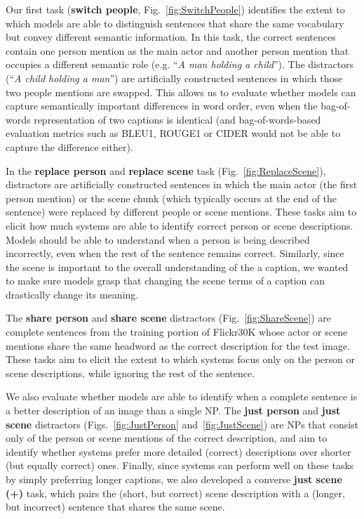 \documentclass[11pt]{article}
\begin{document}
Our first task (\textbf{switch people}, Fig.~\ref{fig:SwitchPeople}) identifies the extent to which models are able to distinguish sentences that share the same vocabulary but convey different semantic information. In this task,  the correct sentences contain one person mention as the main actor and another person mention that occupies a different semantic role (e.g. ``\textit{A man holding a child}''). The distractors (``\textit{A child holding a man}'') are artificially constructed sentences in which those two people mentions are swapped. This allows us to evaluate whether models can capture semantically important differences in word order, even when the bag-of-words representation of two captions is identical (and bag-of-words-based evaluation metrics such as BLEU1, ROUGE1 or CIDER would not be able to capture the difference
 either). 

In the \textbf{replace person} and \textbf{replace scene} task (Fig.~\ref{fig:ReplaceScene}), distractors are artificially constructed sentences in which the main actor (the first person mention) or the scene chunk (which typically occurs at the end of the sentence) were replaced by different people or scene mentions. These tasks aim to elicit how much systems are able to identify correct person or scene descriptions.  Models should be able to understand when a person is being described incorrectly, even when the rest of the sentence remains correct.  Similarly, since the scene is important to the overall understanding of the a caption, we wanted to make sure models grasp that changing the scene terms of a caption can drastically change its meaning. 

The \textbf{share person} and \textbf{share scene} distractors (Fig.~\ref{fig:ShareScene}) are complete sentences  from the training portion of  Flickr30K whose actor or scene mentions share the same headword as the correct description for the test image. These tasks aim to elicit the extent to which systems focus only on the person or scene descriptions, while ignoring the rest of the sentence. 

We also evaluate whether models are able to identify when a complete sentence is a better description of an image than a single NP.  The {\bf just person} and {\bf just scene} distractors (Figs.~\ref{fig:JustPerson} and~\ref{fig:JustScene}) are NPs that consist only of the person or scene mentions of the correct description, and aim to identify whether systems prefer more detailed (correct) descriptions over shorter (but equally correct) ones. Finally, since systems can perform well on these tasks by simply preferring longer captions, we also developed a converse {\bf just scene (+)} task, which pairs the (short, but correct) scene description with a (longer, but incorrect) sentence that shares the same scene. 
\end{document}
